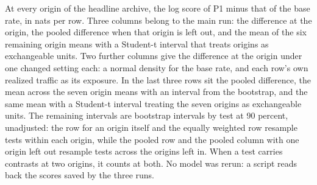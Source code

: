 \begin{table}[tp]\centering\scriptsize
\caption{At every origin of the headline archive, the log score of P1 minus that of the base rate, in nats per row. Three columns belong to the main run: the difference at the origin, the pooled difference when that origin is left out, and the mean of the six remaining origin means with a Student-t interval that treats origins as exchangeable units. Two further columns give the difference at the origin under one changed setting each: a normal density for the base rate, and each row's own realized traffic as its exposure. In the last three rows sit the pooled difference, the mean across the seven origin means with an interval from the bootstrap, and the same mean with a Student-t interval treating the seven origins as exchangeable units. The remaining intervals are bootstrap intervals by test at 90 percent, unadjusted: the row for an origin itself and the equally weighted row resample tests within each origin, while the pooled row and the pooled column with one origin left out resample tests across the origins left in. When a test carries contrasts at two origins, it counts at both. No model was rerun: a script reads back the scores saved by the three runs.}
\label{tab:fmt-by-origin}
\resizebox{\columnwidth}{!}{%
}
\end{table}

